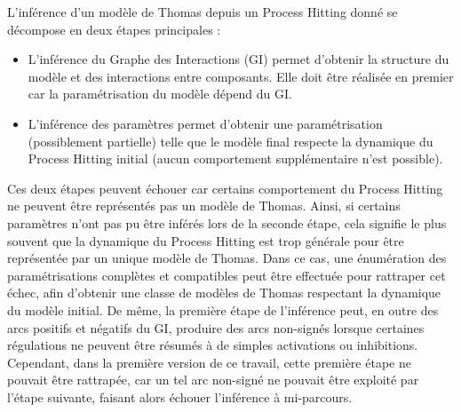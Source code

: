 L'inférence d'un modèle de Thomas depuis un Process Hitting donné se décompose en deux étapes principales :
\begin{itemize}
  \item L'inférence du Graphe des Interactions (GI) permet d'obtenir la structure du modèle et des interactions entre composants.
  Elle doit être réalisée en premier car la paramétrisation du modèle dépend du GI.
  \item L'inférence des paramètres permet d'obtenir une paramétrisation (possiblement partielle) telle que le modèle final respecte la dynamique du Process Hitting initial (aucun comportement supplémentaire n'est possible).
\end{itemize}
Ces deux étapes peuvent échouer car certains comportement du Process Hitting ne peuvent être représentés pas un modèle de Thomas.
Ainsi, si certains paramètres n'ont pas pu être inférés lors de la seconde étape, cela signifie le plus souvent que la dynamique du Process Hitting est trop générale pour être représentée par un unique modèle de Thomas.
Dans ce cas, une énumération des paramétrisations complètes et compatibles peut être effectuée pour rattraper cet échec, afin d'obtenir une classe de modèles de Thomas respectant la dynamique du modèle initial.
De même, la première étape de l'inférence peut, en outre des arcs positifs et négatifs du GI, produire des arcs non-signés lorsque certaines régulations ne peuvent être résumés à de simples activations ou inhibitions.
Cependant, dans la première version de ce travail, cette première étape ne pouvait être rattrapée,
car un tel arc non-signé ne pouvait être exploité par l'étape suivante, faisant alors échouer l'inférence à mi-parcours.

